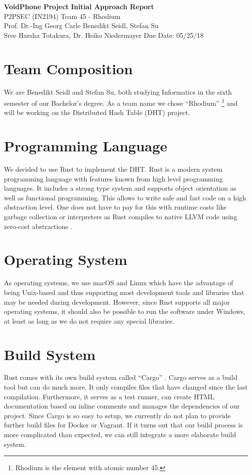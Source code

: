 \documentclass[a4paper, 11pt]{article}
\begin{document}
\noindent
\large\textbf{VoidPhone Project} \hfill \textbf{Initial Approach Report} \\
\normalsize P2PSEC (IN2194)  \hfill Team 45 - Rhodium\\
Prof. Dr.-Ing Georg Carle \hfill Benedikt Seidl, Stefan Su \\
Sree Harsha Totakura, Dr. Heiko Niedermayer \hfill Due Date: 05/25/18

\section*{Team Composition}
We are Benedikt Seidl and Stefan Su, both studying Informatics in the sixth semester of our Bachelor's degree. As a team name we chose ``Rhodium'' \footnote{Rhodium is the element with atomic number 45.} and will be working on the Distributed Hash Table (DHT) project.

\section*{Programming Language}
We decided to use Rust \cite{Rust} to implement the DHT. Rust is a modern system programming language with features known from high level programming languages. It includes a strong type system and supports object orientation as well as functional programming. This allows to write safe and fast code on a high abstraction level. One does not have to pay for this with runtime costs like garbage collection or interpreters as Rust compiles to native LLVM code using zero-cost abstractions \cite{RustFAQ}.

\section*{Operating System}
As operating systems, we use macOS and Linux which have the advantage of being Unix-based and thus supporting most development tools and libraries that may be needed during development. However, since Rust supports all major operating systems, it should also be possible to run the software under Windows, at least as long as we do not require any special libraries.

\section*{Build System}
Rust comes with its own build system called ``Cargo'' \cite{CargoBook}. Cargo serves as a build tool but can do much more. It only compiles files that have changed since the last compilation. Furthermore, it serves as a test runner, can create HTML documentation based on inline comments and manages the dependencies of our project.
Since Cargo is so easy to setup, we currently do not plan to provide further build files for Docker or Vagrant. If it turns out that our build process is more complicated than expected, we can still integrate a more elaborate build system.
\end{document}
